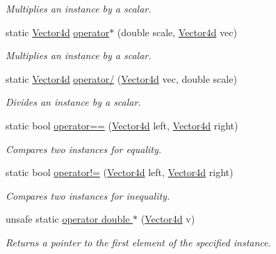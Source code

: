 \begin{DoxyCompactItemize}
\begin{DoxyCompactList}\small\item\em Multiplies an instance by a scalar. \end{DoxyCompactList}\item 
static \hyperlink{struct_open_t_k_1_1_vector4d}{Vector4d} \hyperlink{struct_open_t_k_1_1_vector4d_ae08eac66b5d9b3486abaab3c88940cd0}{operator$\ast$} (double scale, \hyperlink{struct_open_t_k_1_1_vector4d}{Vector4d} vec)
\begin{DoxyCompactList}\small\item\em Multiplies an instance by a scalar. \end{DoxyCompactList}\item 
static \hyperlink{struct_open_t_k_1_1_vector4d}{Vector4d} \hyperlink{struct_open_t_k_1_1_vector4d_aff9dc6f74fbff719084af0e678f07cb5}{operator/} (\hyperlink{struct_open_t_k_1_1_vector4d}{Vector4d} vec, double scale)
\begin{DoxyCompactList}\small\item\em Divides an instance by a scalar. \end{DoxyCompactList}\item 
static bool \hyperlink{struct_open_t_k_1_1_vector4d_a87f404525bcd3f3e3647955038712810}{operator==} (\hyperlink{struct_open_t_k_1_1_vector4d}{Vector4d} left, \hyperlink{struct_open_t_k_1_1_vector4d}{Vector4d} right)
\begin{DoxyCompactList}\small\item\em Compares two instances for equality. \end{DoxyCompactList}\item 
static bool \hyperlink{struct_open_t_k_1_1_vector4d_a78b2c0a5bb644d338756bbb597a1a7e6}{operator!=} (\hyperlink{struct_open_t_k_1_1_vector4d}{Vector4d} left, \hyperlink{struct_open_t_k_1_1_vector4d}{Vector4d} right)
\begin{DoxyCompactList}\small\item\em Compares two instances for inequality. \end{DoxyCompactList}\item 
unsafe static \hyperlink{struct_open_t_k_1_1_vector4d_ac465f329343b60e7af342a0c49494cc0}{operator double $\ast$} (\hyperlink{struct_open_t_k_1_1_vector4d}{Vector4d} v)
\begin{DoxyCompactList}\small\item\em Returns a pointer to the first element of the specified instance. \end{DoxyCompactList}\item 

\end{DoxyCompactItemize}
